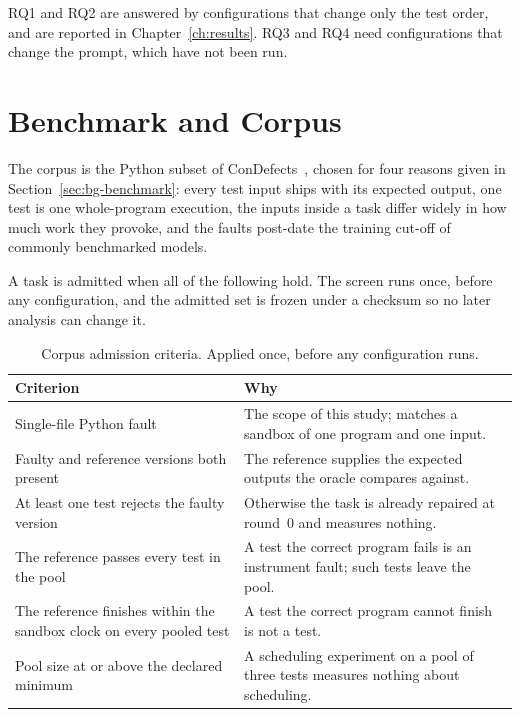 RQ1 and RQ2 are answered by configurations that change only the test order, and
are reported in Chapter~\ref{ch:results}. RQ3 and RQ4 need configurations that
change the prompt, which have not been run.

\section{Benchmark and Corpus}
\label{sec:exp-benchmark}

The corpus is the Python subset of ConDefects~\citep{wu2024condefects}, chosen
for four reasons given in Section~\ref{sec:bg-benchmark}: every test input
ships with its expected output, one test is one whole-program execution, the
inputs inside a task differ widely in how much work they provoke, and the
faults post-date the training cut-off of commonly benchmarked models.

A task is admitted when all of the following hold. The screen runs once, before
any configuration, and the admitted set is frozen under a checksum so no later
analysis can change it.

\begin{table}[htbp]
\centering
\caption{Corpus admission criteria. Applied once, before any configuration runs.}
\label{tab:gate}
\small
\begin{tabularx}{\textwidth}{@{}>{\raggedright\arraybackslash}p{} X@{}}
\toprule
Criterion & Why\\
\midrule
Single-file Python fault & The scope of this study; matches a sandbox of one
program and one input.\\
Faulty and reference versions both present & The reference supplies the
expected outputs the oracle compares against.\\
At least one test rejects the faulty version & Otherwise the task is already
repaired at round~$0$ and measures nothing.\\
The reference passes every test in the pool & A test the correct program fails
is an instrument fault; such tests leave the pool.\\
The reference finishes within the sandbox clock on every pooled test & A test
the correct program cannot finish is not a test.\\
Pool size at or above the declared minimum & A scheduling experiment on a pool
of three tests measures nothing about scheduling.\\
\bottomrule
\end{tabularx}
\end{table}

